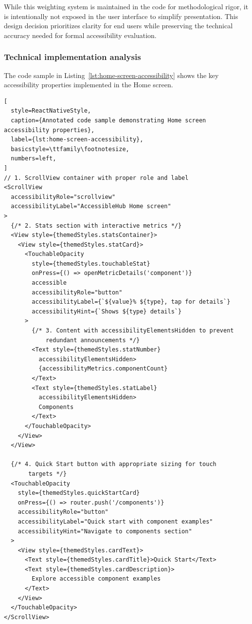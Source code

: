 While this weighting system is maintained in the code for methodological rigor, it is intentionally not exposed in the user interface to simplify presentation. This design decision prioritizes clarity for end users while preserving the technical accuracy needed for formal accessibility evaluation.

\subsubsection{Technical implementation analysis}

The code sample in Listing~\ref{lst:home-screen-accessibility} shows the key accessibility properties implemented in the Home screen.

\begin{lstlisting}[
  style=ReactNativeStyle,
  caption={Annotated code sample demonstrating Home screen accessibility properties},
  label={lst:home-screen-accessibility},
  basicstyle=\ttfamily\footnotesize,
  numbers=left,
]
// 1. ScrollView container with proper role and label
<ScrollView
  accessibilityRole="scrollview"
  accessibilityLabel="AccessibleHub Home screen"
>
  {/* 2. Stats section with interactive metrics */}
  <View style={themedStyles.statsContainer}>
    <View style={themedStyles.statCard}>
      <TouchableOpacity
        style={themedStyles.touchableStat}
        onPress={() => openMetricDetails('component')}
        accessible
        accessibilityRole="button"
        accessibilityLabel={`${value}% ${type}, tap for details`}
        accessibilityHint={`Shows ${type} details`}
      >
        {/* 3. Content with accessibilityElementsHidden to prevent 
            redundant announcements */}
        <Text style={themedStyles.statNumber} 
          accessibilityElementsHidden>
          {accessibilityMetrics.componentCount}
        </Text>
        <Text style={themedStyles.statLabel} 
          accessibilityElementsHidden>
          Components
        </Text>
      </TouchableOpacity>
    </View>
  </View>

  {/* 4. Quick Start button with appropriate sizing for touch 
       targets */}
  <TouchableOpacity
    style={themedStyles.quickStartCard}
    onPress={() => router.push('/components')}
    accessibilityRole="button"
    accessibilityLabel="Quick start with component examples"
    accessibilityHint="Navigate to components section"
  >
    <View style={themedStyles.cardText}>
      <Text style={themedStyles.cardTitle}>Quick Start</Text>
      <Text style={themedStyles.cardDescription}>
        Explore accessible component examples
      </Text>
    </View>
  </TouchableOpacity>
</ScrollView>
\end{lstlisting}

